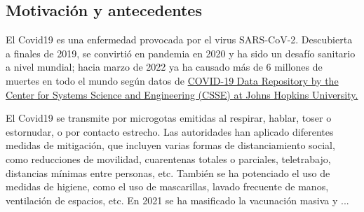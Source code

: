 \begin{intro}





\section*{Motivación y antecedentes}

El Covid19 es una enfermedad provocada por el virus SARS-CoV-2. Descubierta a finales de 2019, se convirtió en pandemia en 2020 y ha sido un desafío sanitario a nivel mundial; hacia marzo de 2022 ya ha causado más de 6 millones de muertes en todo el mundo según datos de \href{https://ourworldindata.org/explorers/coronavirus-data-explorer?facet=none&pickerSort=desc&pickerMetric=total_cases&Metric=Confirmed+deaths&Interval=Cumulative&Relative+to+Population=false&Color+by+test+positivity=false&country=~OWID_WRL}{COVID-19 Data Repository by the Center for Systems Science and Engineering (CSSE) at Johns Hopkins University.} 

El Covid19 se transmite por microgotas emitidas al respirar, hablar, toser o estornudar, o por contacto estrecho. Las autoridades han aplicado diferentes medidas de mitigación, que incluyen varias formas de distanciamiento social, como reducciones de movilidad, cuarentenas totales o parciales, teletrabajo, distancias mínimas entre personas, etc. También se ha potenciado el uso de medidas de higiene, como el uso de mascarillas, lavado frecuente de manos, ventilación de espacios, etc. En 2021 se ha masificado la vacunación masiva y ...


\end{intro}

